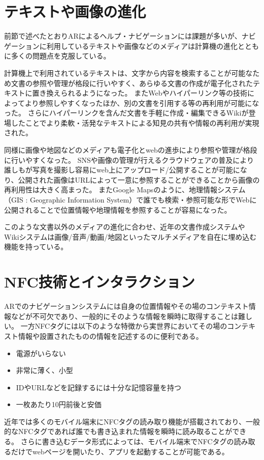 \section{テキストや画像の進化}
前節で述べたとおりARによるヘルプ・ナビゲーションには課題が多いが、ナビゲーションに利用しているテキストや画像などのメディアは計算機の進化とともに多くの問題点を克服している。

計算機上で利用されているテキストは、文字から内容を検索することが可能なため文書の参照や管理が格段に行いやすく、あらゆる文書の作成が電子化されたテキストに置き換えられるようになった。
またWebやハイパーリンク等の技術によってより参照しやすくなったほか、別の文書を引用する等の再利用が可能になった。
さらにハイパーリンクを含んだ文書を手軽に作成・編集できるWiki\cite{Leuf2001TheWW}が登場したことでより柔軟・活発なテキストによる知見の共有や情報の再利用が実現された。

同様に画像や地図などのメディアも電子化とwebの進歩により参照や管理が格段に行いやすくなった。
SNSや画像の管理が行えるクラウドウェアの普及により誰しもが写真を撮影し容易にweb上にアップロード/公開することが可能になり、公開された画像はURLによって一意に参照することができることから画像の再利用性は大きく高まった。
またGoogle Mapsのように、地理情報システム（GIS : Geographic Information System）で誰でも検索・参照可能な形でWebに公開されることで位置情報や地理情報を参照することが容易になった。

このような文書以外のメディアの進化に合わせ、近年の文書作成システムやWikiシステムは画像/音声/動画/地図といったマルチメディアを自在に埋め込む機能を持っている。


\section{NFC技術とインタラクション}
ARでのナビゲーションシステムには自身の位置情報やその場のコンテキスト情報などが不可欠であり、一般的にそのような情報を瞬時に取得することは難しい。
一方NFCタグには以下のような特徴から実世界においてその場のコンテキスト情報や設置されたものの情報を記述するのに便利である。

\begin{itemize}
  \item 電源がいらない
  \item 非常に薄く、小型
  \item IDやURLなどを記録するには十分な記憶容量を持つ
  \item 一枚あたり10円前後と安価
\end{itemize}

近年では多くのモバイル端末にNFCタグの読み取り機能が搭載されており、一般的なNFCタグであれば誰でも書き込まれた情報を瞬時に読み取ることができる。
さらに書き込むデータ形式によっては、モバイル端末でNFCタグの読み取るだけでwebページを開いたり、アプリを起動することが可能である。

